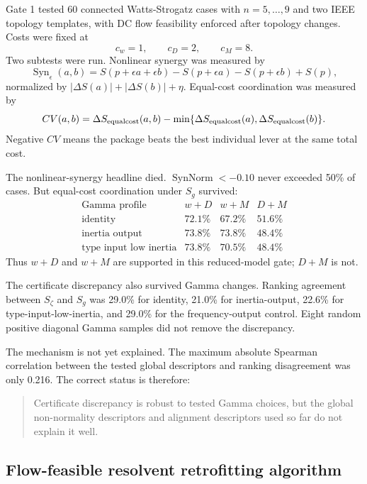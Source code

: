 \documentclass[11pt]{article}
\begin{document}
Gate 1 tested 60 connected Watts-Strogatz cases with $n=5,\ldots,9$ and two
IEEE topology templates, with DC flow feasibility enforced after topology
changes. Costs were fixed at
\[
  c_w=1,\qquad c_D=2,\qquad c_M=8.
\]
Two subtests were run. Nonlinear synergy was measured by
\begin{equation}
  \operatorname{Syn}_\epsilon(a,b)
  =
  S(p+\epsilon a+\epsilon b)-S(p+\epsilon a)-S(p+\epsilon b)+S(p),
  \label{eq:synergy}
\end{equation}
normalized by $|\Delta S(a)|+|\Delta S(b)|+\eta$. Equal-cost coordination was
measured by
\begin{equation}
  CV(a,b)=\Delta S_{\rm equalcost}(a,b)
  -\min\{\Delta S_{\rm equalcost}(a),\Delta S_{\rm equalcost}(b)\}.
  \label{eq:coordination-value}
\end{equation}
Negative $CV$ means the package beats the best individual lever at the same
total cost.

The nonlinear-synergy headline died. $\operatorname{SynNorm}<-0.10$ never
exceeded 50\% of cases. But equal-cost coordination under $S_g$ survived:
\[
\begin{array}{c|ccc}
\text{Gamma profile} & w+D & w+M & D+M\\
\hline
\text{identity} & 72.1\% & 67.2\% & 51.6\%\\
\text{inertia output} & 73.8\% & 73.8\% & 48.4\%\\
\text{type input low inertia} & 73.8\% & 70.5\% & 48.4\%
\end{array}
\]
Thus $w+D$ and $w+M$ are supported in this reduced-model gate; $D+M$ is not.

The certificate discrepancy also survived Gamma changes. Ranking agreement
between $S_\zeta$ and $S_g$ was 29.0\% for identity, 21.0\% for inertia-output,
22.6\% for type-input-low-inertia, and 29.0\% for the frequency-output control.
Eight random positive diagonal Gamma samples did not remove the discrepancy.

The mechanism is not yet explained. The maximum absolute Spearman correlation
between the tested global descriptors and ranking disagreement was only 0.216.
The correct status is therefore:

\begin{quote}
Certificate discrepancy is robust to tested Gamma choices, but the global
non-normality descriptors and alignment descriptors used so far do not explain
it well.
\end{quote}

\subsection{Flow-feasible resolvent retrofitting algorithm}
\end{document}

